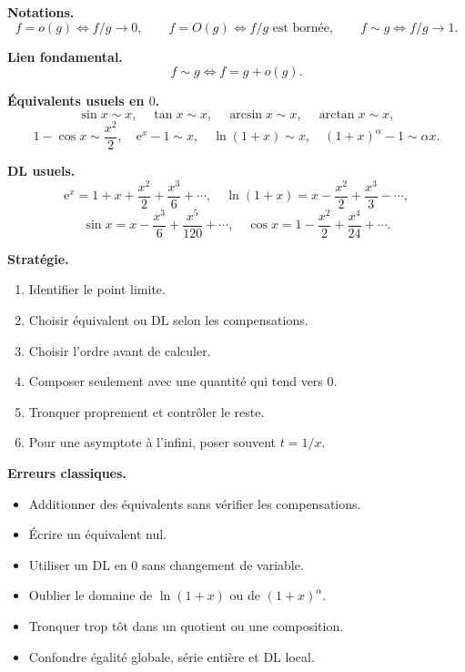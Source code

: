 \documentclass[11pt,a4paper]{article}
\newcommand{\e}{\mathrm{e}}
\begin{document}
\begin{tcolorbox}[colframe=black!70,colback=grisclair,title={Fiche de synthèse — DL, équivalents et asymptotiques}]
\textbf{Notations.}
\[
  f=o(g)\iff f/g\to0,
  \qquad
  f=O(g)\iff f/g\text{ est bornée},
  \qquad
  f\sim g\iff f/g\to1.
\]

\textbf{Lien fondamental.}
\[
  f\sim g\iff f=g+o(g).
\]

\textbf{Équivalents usuels en $0$.}
\[
\sin x\sim x,
\quad \tan x\sim x,
\quad \arcsin x\sim x,
\quad \arctan x\sim x,
\]
\[
1-\cos x\sim\frac{x^2}{2},
\quad \e^x-1\sim x,
\quad \ln(1+x)\sim x,
\quad (1+x)^\alpha-1\sim\alpha x.
\]

\textbf{DL usuels.}
\[
\e^x=1+x+\frac{x^2}{2}+\frac{x^3}{6}+\cdots,
\quad
\ln(1+x)=x-\frac{x^2}{2}+\frac{x^3}{3}-\cdots,
\]
\[
\sin x=x-\frac{x^3}{6}+\frac{x^5}{120}+\cdots,
\quad
\cos x=1-\frac{x^2}{2}+\frac{x^4}{24}+\cdots.
\]

\textbf{Stratégie.}
\begin{enumerate}[label=\arabic*)]
\item Identifier le point limite.
\item Choisir équivalent ou DL selon les compensations.
\item Choisir l'ordre avant de calculer.
\item Composer seulement avec une quantité qui tend vers $0$.
\item Tronquer proprement et contrôler le reste.
\item Pour une asymptote à l'infini, poser souvent $t=1/x$.
\end{enumerate}

\textbf{Erreurs classiques.}
\begin{itemize}[label=$\triangleright$]
\item Additionner des équivalents sans vérifier les compensations.
\item Écrire un équivalent nul.
\item Utiliser un DL en $0$ sans changement de variable.
\item Oublier le domaine de $\ln(1+x)$ ou de $(1+x)^\alpha$.
\item Tronquer trop tôt dans un quotient ou une composition.
\item Confondre égalité globale, série entière et DL local.
\end{itemize}
\end{tcolorbox}
\end{document}
